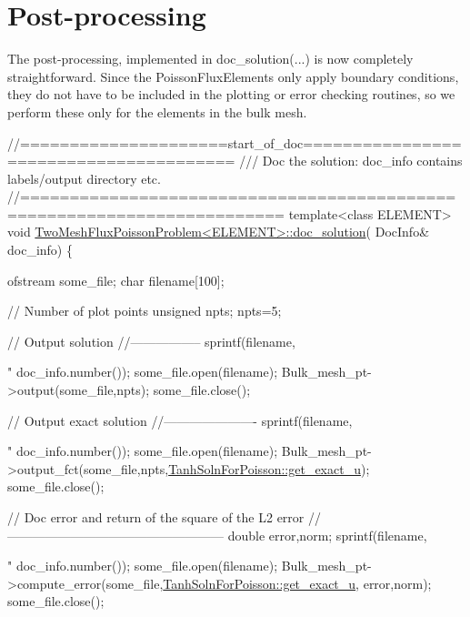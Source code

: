 \hypertarget{index_doc}{}\section{Post-\/processing}\label{index_doc}
The post-\/processing, implemented in {\ttfamily doc\+\_\+solution}(...) is now completely straightforward. Since the {\ttfamily Poisson\+Flux\+Elements} only apply boundary conditions, they do not have to be included in the plotting or error checking routines, so we perform these only for the elements in the bulk mesh.


\begin{DoxyCodeInclude}
\textcolor{comment}{//=====================start\_of\_doc=======================================}
\textcolor{comment}{/// Doc the solution: doc\_info contains labels/output directory etc.}
\textcolor{comment}{}\textcolor{comment}{//========================================================================}
\textcolor{keyword}{template}<\textcolor{keyword}{class} ELEMENT>
\textcolor{keywordtype}{void} \hyperlink{classTwoMeshFluxPoissonProblem_a6320ad6d71f24a2d7e03a7bb7e691b31}{TwoMeshFluxPoissonProblem<ELEMENT>::doc\_solution}(
      DocInfo& doc\_info)
\{ 

 ofstream some\_file;
 \textcolor{keywordtype}{char} filename[100];

 \textcolor{comment}{// Number of plot points}
 \textcolor{keywordtype}{unsigned} npts;
 npts=5; 

 \textcolor{comment}{// Output solution }
 \textcolor{comment}{//-----------------}
 sprintf(filename,\textcolor{stringliteral}{"%
         doc\_info.number());
 some\_file.open(filename);
 Bulk\_mesh\_pt->output(some\_file,npts);
 some\_file.close();

 \textcolor{comment}{// Output exact solution }
 \textcolor{comment}{//----------------------}
 sprintf(filename,\textcolor{stringliteral}{"%
         doc\_info.number());
 some\_file.open(filename);
 Bulk\_mesh\_pt->output\_fct(some\_file,npts,\hyperlink{namespaceTanhSolnForPoisson_af7896e9c18ce6438c73ae2a875e8b7de}{TanhSolnForPoisson::get\_exact\_u}); 
 some\_file.close();


 \textcolor{comment}{// Doc error and return of the square of the L2 error}
 \textcolor{comment}{//---------------------------------------------------}
 \textcolor{keywordtype}{double} error,norm;
 sprintf(filename,\textcolor{stringliteral}{"%
         doc\_info.number());
 some\_file.open(filename);
 Bulk\_mesh\_pt->compute\_error(some\_file,\hyperlink{namespaceTanhSolnForPoisson_af7896e9c18ce6438c73ae2a875e8b7de}{TanhSolnForPoisson::get\_exact\_u},
                               error,norm); 
 some\_file.close();

}}}
\end{DoxyCodeInclude}
